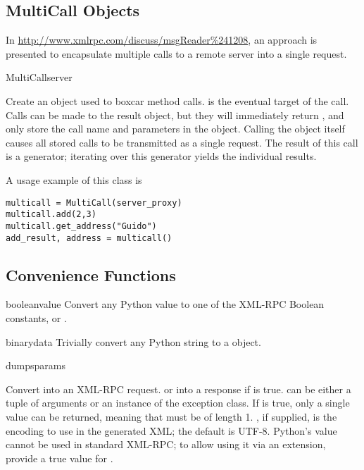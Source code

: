 \subsection{MultiCall Objects}


In \url{http://www.xmlrpc.com/discuss/msgReader\%241208}, an approach
is presented to encapsulate multiple calls to a remote server into a
single request.

\begin{classdesc}{MultiCall}{server}

Create an object used to boxcar method calls.  is the
eventual target of the call. Calls can be made to the result object,
but they will immediately return , and only store the
call name and parameters in the  object. Calling
the object itself causes all stored calls to be transmitted as
a single  request. The result of this call
is a generator; iterating over this generator yields the individual
results.

\end{classdesc}

A usage example of this class is

\begin{verbatim}
multicall = MultiCall(server_proxy)
multicall.add(2,3)
multicall.get_address("Guido")
add_result, address = multicall()
\end{verbatim}

\subsection{Convenience Functions}

\begin{funcdesc}{boolean}{value}
Convert any Python value to one of the XML-RPC Boolean constants,
 or .
\end{funcdesc}

\begin{funcdesc}{binary}{data}
Trivially convert any Python string to a  object.
\end{funcdesc}

\begin{funcdesc}{dumps}{params}

Convert  into an XML-RPC request.
or into a response if  is true.
 can be either a tuple of arguments or an instance of the 
 exception class.  If  is true,
only a single value can be returned, meaning that  must be of length 1.
, if supplied, is the encoding to use in the generated
XML; the default is UTF-8.  Python's  value cannot be
used in standard XML-RPC; to allow using it via an extension, 
provide a true value for .
\end{funcdesc}

